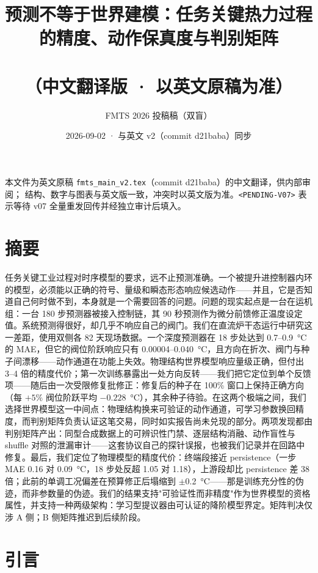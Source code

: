 \documentclass[11pt]{article}
\title{\textbf{预测不等于世界建模：任务关键热力过程的精度、动作保真度与判别矩阵}\\\\
\large（中文翻译版 · 以英文原稿为准）}
\author{FMTS 2026 投稿稿（双盲）}
\date{2026-09-02 · 与英文 v2（commit d21baba）同步}
\begin{document}
\maketitle
\vspace{-2em}
\begin{center}
\small 本文件为英文原稿 \texttt{fmts\_main\_v2.tex}（commit d21baba）的中文翻译，供内部审阅；
结构、数字与图表与英文版一致，冲突时以英文版为准。\texttt{\textless PENDING-V07\textgreater}
表示等待 v07 全量重发回传并经独立审计后填入。
\end{center}

\section*{摘要}

任务关键工业过程对时序模型的要求，远不止预测准确。一个被提升进控制器内环的模型，必须能以正确的符号、量级和瞬态形态响应候选动作——并且，它是否知道自己何时做不到，本身就是一个需要回答的问题。问题的现实起点是一台在运机组：一台 180 步预测器被接入控制链，其 90 秒预测作为微分前馈修正温度设定值。系统预测得很好，却几乎不响应自己的阀门。我们在直流炉干态运行中研究这一差距，使用双侧各 82 天现场数据。一个深度预测器在 18 步处达到 0.7--0.9~\si{\degreeCelsius} 的 MAE，但它的阀位阶跃响应只有 0.00004--0.040~\si{\degreeCelsius}，且方向在折次、阀门与种子间漂移——动作通道在功能上失效。物理结构世界模型响应量级正确，但付出 3--4 倍的精度代价；第一次训练暴露出一处方向反转——我们把它定位到单个反馈项——随后由一次受限修复批修正：修复后的种子在 100\% 窗口上保持正确方向（每 $+5\%$ 阀位阶跃平均 $-0.228$~\si{\degreeCelsius}），其余种子待验。在这两个极端之间，我们选择世界模型这一中间点：物理结构换来可验证的动作通道，可学习参数换回精度，而判别矩阵负责认证这笔交易，同时如实报告尚未兑现的部分。两项发现都由判别矩阵产出：同型合成数据上的可辨识性门禁、逐层结构消融、动作盲性与 shuffle 对照的泄漏审计——这套协议自己的探针误报，也被我们记录并在回路中修复。最后，我们定位了物理模型的精度代价：终端段接近 persistence（一步 MAE 0.16 对 0.09~\si{\degreeCelsius}，18 步处反超 1.05 对 1.18），上游段却比 persistence 差 38 倍；此前的单调工况偏差在预算修正后塌缩到 $\pm$0.2~\si{\degreeCelsius}——那是训练充分性的伪迹，而非参数量的伪迹。我们的结果支持"可验证性而非精度"作为世界模型的资格属性，并支持一种两级架构：学习型提议器由可认证的降阶模型界定。矩阵判决仅涉 A 侧；B 侧矩阵推迟到后续阶段。

\section{引言}
\end{document}
